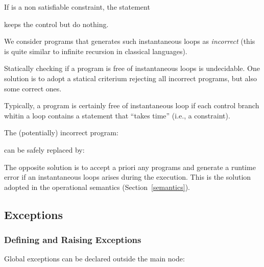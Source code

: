 \begin{example}
If  is a non satisfiable constraint, the statement
\begin{program}
  
\end{program}
keeps the control but do nothing.
\end{example}

We consider programs that  generates such instantaneous loops as {\em
  incorrect}  (this  is  quite   similar  to  infinite  recursion  in
classical languages).

Statically checking  if a program  is free of instantaneous  loops is
undecidable. One solution is  to adopt a statical criterium rejecting
all incorrect programs, but also some correct ones.

Typically, a program is certainly  free of instantaneous loop if each
control branch whitin a loop contains a statement that ``takes time''
(i.e., a constraint).

\begin{example}
The (potentially) incorrect program:
\begin{program}
  
\end{program}
can be safely replaced by: 
\begin{program}
 \OB {}    \CB
\end{program}
\end{example}

The opposite solution is to accept a priori any programs and generate
a  runtime  error  if   an  instantaneous  loops  arises  during  the
execution.  This is the solution adopted in the operational semantics
(Section~\ref{semantics}).





\subsection{Exceptions}

\subsubsection{Defining and Raising Exceptions}

Global    exceptions    can   be    declared    outside   the    main
node:

    

